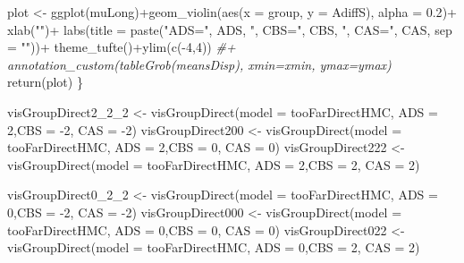 \documentclass[
  10pt,
  dvipsnames,enabledeprecatedfontcommands]{scrartcl}
\newenvironment{Shaded}{\begin{snugshade}}{\end{snugshade}}
\newcommand{\AttributeTok}[1]{\textcolor[rgb]{0.77,0.63,0.00}{#1}}
\newcommand{\CommentTok}[1]{\textcolor[rgb]{0.56,0.35,0.01}{\textit{#1}}}
\newcommand{\DecValTok}[1]{\textcolor[rgb]{0.00,0.00,0.81}{#1}}
\newcommand{\FloatTok}[1]{\textcolor[rgb]{0.00,0.00,0.81}{#1}}
\newcommand{\FunctionTok}[1]{\textcolor[rgb]{0.00,0.00,0.00}{#1}}
\newcommand{\NormalTok}[1]{#1}
\newcommand{\OtherTok}[1]{\textcolor[rgb]{0.56,0.35,0.01}{#1}}
\newcommand{\SpecialCharTok}[1]{\textcolor[rgb]{0.00,0.00,0.00}{#1}}
\newcommand{\StringTok}[1]{\textcolor[rgb]{0.31,0.60,0.02}{#1}}
\begin{document}
\begin{Shaded}
\begin{Highlighting}[]
\NormalTok{  plot }\OtherTok{\textless{}{-}} \FunctionTok{ggplot}\NormalTok{(muLong)}\SpecialCharTok{+}\FunctionTok{geom\_violin}\NormalTok{(}\FunctionTok{aes}\NormalTok{(}\AttributeTok{x =}\NormalTok{ group, }\AttributeTok{y =}\NormalTok{ AdiffS), }\AttributeTok{alpha =} \FloatTok{0.2}\NormalTok{)}\SpecialCharTok{+}
    \FunctionTok{xlab}\NormalTok{(}\StringTok{""}\NormalTok{)}\SpecialCharTok{+}
    \FunctionTok{labs}\NormalTok{(}\AttributeTok{title =} \FunctionTok{paste}\NormalTok{(}\StringTok{"ADS="}\NormalTok{, ADS, }\StringTok{", CBS="}\NormalTok{,  CBS, }\StringTok{", CAS="}\NormalTok{, CAS,  }\AttributeTok{sep =} \StringTok{""}\NormalTok{))}\SpecialCharTok{+}
    \FunctionTok{theme\_tufte}\NormalTok{()}\SpecialCharTok{+}\FunctionTok{ylim}\NormalTok{(}\FunctionTok{c}\NormalTok{(}\SpecialCharTok{{-}}\DecValTok{4}\NormalTok{,}\DecValTok{4}\NormalTok{))}
  \CommentTok{\#+   annotation\_custom(tableGrob(meansDisp), xmin=xmin,  ymax=ymax)}
  \FunctionTok{return}\NormalTok{(plot)}
\NormalTok{\}}



\NormalTok{visGroupDirect2\_2\_2 }\OtherTok{\textless{}{-}}  \FunctionTok{visGroupDirect}\NormalTok{(}\AttributeTok{model =}\NormalTok{ tooFarDirectHMC, }\AttributeTok{ADS =} \DecValTok{2}\NormalTok{,}\AttributeTok{CBS =} \SpecialCharTok{{-}}\DecValTok{2}\NormalTok{, }\AttributeTok{CAS =} \SpecialCharTok{{-}}\DecValTok{2}\NormalTok{)}
\NormalTok{visGroupDirect200 }\OtherTok{\textless{}{-}}  \FunctionTok{visGroupDirect}\NormalTok{(}\AttributeTok{model =}\NormalTok{ tooFarDirectHMC, }\AttributeTok{ADS =} \DecValTok{2}\NormalTok{,}\AttributeTok{CBS =} \DecValTok{0}\NormalTok{, }\AttributeTok{CAS =} \DecValTok{0}\NormalTok{)}
\NormalTok{visGroupDirect222 }\OtherTok{\textless{}{-}} \FunctionTok{visGroupDirect}\NormalTok{(}\AttributeTok{model =}\NormalTok{ tooFarDirectHMC, }\AttributeTok{ADS =} \DecValTok{2}\NormalTok{,}\AttributeTok{CBS =} \DecValTok{2}\NormalTok{, }\AttributeTok{CAS =} \DecValTok{2}\NormalTok{)}

\NormalTok{visGroupDirect0\_2\_2 }\OtherTok{\textless{}{-}}  \FunctionTok{visGroupDirect}\NormalTok{(}\AttributeTok{model =}\NormalTok{ tooFarDirectHMC, }\AttributeTok{ADS =} \DecValTok{0}\NormalTok{,}\AttributeTok{CBS =} \SpecialCharTok{{-}}\DecValTok{2}\NormalTok{, }\AttributeTok{CAS =} \SpecialCharTok{{-}}\DecValTok{2}\NormalTok{)}
\NormalTok{visGroupDirect000 }\OtherTok{\textless{}{-}}  \FunctionTok{visGroupDirect}\NormalTok{(}\AttributeTok{model =}\NormalTok{ tooFarDirectHMC, }\AttributeTok{ADS =} \DecValTok{0}\NormalTok{,}\AttributeTok{CBS =} \DecValTok{0}\NormalTok{, }\AttributeTok{CAS =} \DecValTok{0}\NormalTok{)}
\NormalTok{visGroupDirect022 }\OtherTok{\textless{}{-}} \FunctionTok{visGroupDirect}\NormalTok{(}\AttributeTok{model =}\NormalTok{ tooFarDirectHMC, }\AttributeTok{ADS =} \DecValTok{0}\NormalTok{,}\AttributeTok{CBS =} \DecValTok{2}\NormalTok{, }\AttributeTok{CAS =} \DecValTok{2}\NormalTok{)}



\end{Highlighting}
\end{Shaded}
\end{document}
